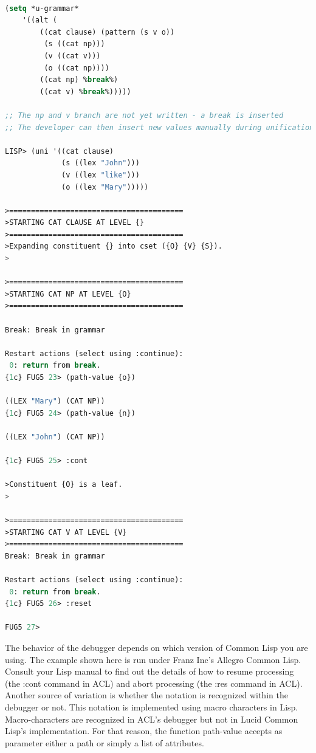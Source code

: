 \documentclass[10pt,a4paper]{report}
\begin{document}
\begin{lstlisting}[language=Lisp]

(setq *u-grammar* 
	'((alt (
		((cat clause) (pattern (s v o))
		 (s ((cat np)))
		 (v ((cat v)))
		 (o ((cat np))))
		((cat np) %break%)
		((cat v) %break%)))))

;; The np and v branch are not yet written - a break is inserted
;; The developer can then insert new values manually during unification.

LISP> (uni '((cat clause) 
             (s ((lex "John"))) 
             (v ((lex "like"))) 
             (o ((lex "Mary")))))

>========================================
>STARTING CAT CLAUSE AT LEVEL {}
>========================================
>Expanding constituent {} into cset ({O} {V} {S}).
>

>========================================
>STARTING CAT NP AT LEVEL {O}
>========================================

Break: Break in grammar

Restart actions (select using :continue):
 0: return from break.
{1c} FUG5 23> (path-value {o})

((LEX "Mary") (CAT NP)) 
{1c} FUG5 24> (path-value {n})

((LEX "John") (CAT NP))

{1c} FUG5 25> :cont

>Constituent {O} is a leaf.
>

>========================================
>STARTING CAT V AT LEVEL {V}
>========================================
Break: Break in grammar

Restart actions (select using :continue):
 0: return from break.
{1c} FUG5 26> :reset

FUG5 27> 
\end{lstlisting}

The behavior of the debugger depends on which version of Common Lisp you
are using.  The example shown here is run under Franz Inc's Allegro Common
Lisp.  Consult your Lisp manual to find out the details of how to resume
processing (the :cont command in ACL) and abort processing (the :res
command in ACL).  Another source of variation is whether the {} notation is
recognized within the debugger or not.  This notation is implemented using
macro characters in Lisp.  Macro-characters are recognized in ACL's
debugger but not in Lucid Common Lisp's implementation.  For that reason,
the function path-value accepts as parameter either a path or simply a
list of attributes.
\end{document}

